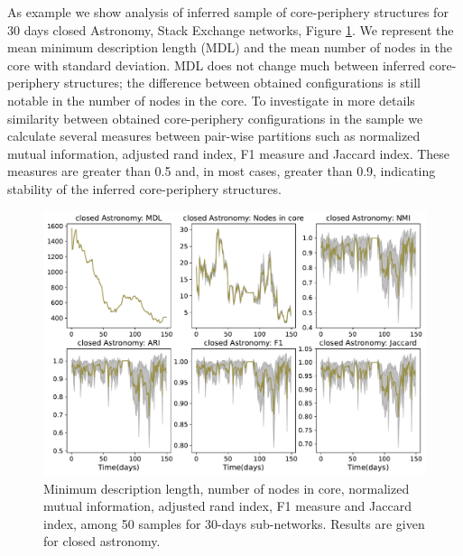 \clearpage
As example we show analysis of inferred sample of  core-periphery structures for 30 days closed Astronomy, Stack Exchange networks, Figure \ref{fig:sample}. We represent the mean minimum description length (MDL) and the mean number of nodes in the core with standard deviation. MDL does not change much between inferred core-periphery structures; the difference between obtained configurations is still notable in the number of nodes in the core.  To investigate in more details similarity between obtained core-periphery configurations in the sample we calculate several measures between pair-wise partitions such as normalized mutual information, adjusted rand index, F1 measure and Jaccard index. These measures are greater than 0.5 and, in most cases, greater than 0.9, indicating stability of the inferred core-periphery structures.


\begin{figure}[h]
	\centering
	\includegraphics[width=0.8\linewidth]{figures/stackexchange/blockmodel_robust.pdf}
	\caption{Minimum description length, number of nodes in core, normalized mutual information, adjusted rand index, F1 measure and Jaccard index, among 50 samples for 30-days sub-networks. Results are given for closed astronomy. }
	\label{fig:sample}
\end{figure}
